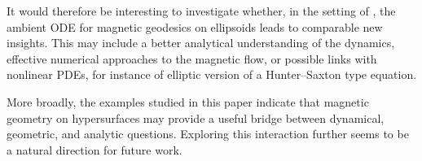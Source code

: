 \documentclass[11pt,reqno]{amsart}
\theoremstyle{plain}
\theoremstyle{definition}
\numberwithin{equation}{section}
\begin{document}
It would therefore be interesting to investigate whether, in the setting of , the ambient ODE for magnetic geodesics on ellipsoids leads to comparable new insights. This may include a better analytical understanding of the dynamics, effective numerical approaches to the magnetic flow, or possible links with nonlinear PDEs, for instance of elliptic version of a Hunter--Saxton type equation.

More broadly, the examples studied in this paper indicate that magnetic geometry on hypersurfaces may provide a useful bridge between dynamical, geometric, and analytic questions. Exploring this interaction further seems to be a natural direction for future work.




\newpage

	
\end{document}
